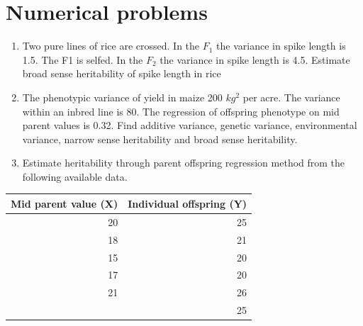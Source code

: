 \documentclass[11pt,dvipsnames,ignorenonframetext,aspectratio=169]{beamer}
\providecommand{\tightlist}{%
  \setlength{\itemsep}{0pt}\setlength{\parskip}{0pt}}
\begin{document}
\hypertarget{numerical-problems}{%
\section{Numerical problems}\label{numerical-problems}}

\begin{frame}{}
\protect\hypertarget{section-15}{}

\begin{enumerate}
\item
  Two pure lines of rice are crossed. In the \(F_1\) the variance in
  spike length is 1.5. The F1 is selfed. In the \(F_2\) the variance in
  spike length is 4.5. Estimate broad sense heritability of spike length
  in rice
\item
  The phenotypic variance of yield in maize 200 \(kg^2\) per acre. The
  variance within an inbred line is 80. The regression of offspring
  phenotype on mid parent values is 0.32. Find additive variance,
  genetic variance, environmental variance, narrow sense heritability
  and broad sense heritability.
\end{enumerate}

\end{frame}

\begin{frame}{}
\protect\hypertarget{section-16}{}

\begin{enumerate}
\setcounter{enumi}{2}
\tightlist
\item
  Estimate heritability through parent offspring regression method from
  the following available data.
\end{enumerate}

\begin{table}[H]
\centering\begingroup\fontsize{6}{8}\selectfont

\begin{tabular}{rr}
\toprule
Mid parent value (X) & Individual offspring (Y)\\
\midrule
20 & 25\\
18 & 21\\
15 & 20\\
17 & 20\\
21 & 26\\
\addlinespace
22 & 25\\
\bottomrule
\end{tabular}
\endgroup{}
\end{table}

\end{frame}
\end{document}
